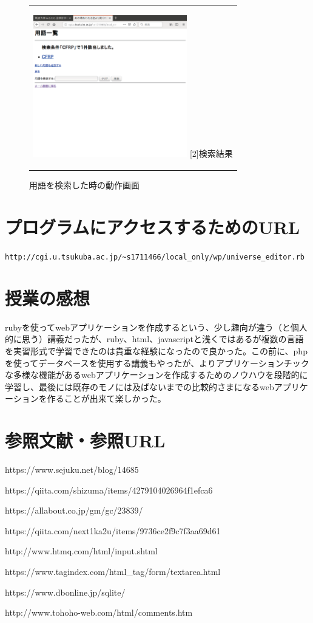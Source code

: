 \documentclass[12pt,a4paper]{jarticle}
\begin{document}
\begin{ttfamily}
\begin{figure}[htbp]
\begin{center}
\begin{tabular}{c}
      \begin{minipage}{0.55\hsize}
        \begin{center}
          \includegraphics[width=6.7cm]{10-3-42.eps}
          \hspace{1.6cm} [2]検索結果
        \end{center}
      \end{minipage}

    \end{tabular}
    \caption{用語を検索した時の動作画面}
    \label{fig:b}
  \end{center}
\end{figure}

\newpage
\newpage
\newpage
\section{プログラムにアクセスするためのURL}
\verb|http://cgi.u.tsukuba.ac.jp/~s1711466/local_only/wp/universe_editor.rb|

\section{授業の感想}
rubyを使ってwebアプリケーションを作成するという、少し趣向が違う（と個人的に思う）講義だったが、ruby、html、javascriptと浅くではあるが複数の言語を実習形式で学習できたのは貴重な経験になったので良かった。この前に、phpを使ってデータベースを使用する講義もやったが、よりアプリケーションチックな多様な機能があるwebアプリケーションを作成するためのノウハウを段階的に学習し、最後には既存のモノには及ばないまでの比較的さまになるwebアプリケーションを作ることが出来て楽しかった。

\section*{参照文献・参照URL}
\par https://www.sejuku.net/blog/14685
\par https://qiita.com/shizuma/items/4279104026964f1efca6
\par https://allabout.co.jp/gm/gc/23839/
\par https://qiita.com/next1ka2u/items/9736ce2f9c7f3aa69d61
\par http://www.htmq.com/html/input.shtml
\par https://www.tagindex.com/html\_tag/form/textarea.html
\par https://www.dbonline.jp/sqlite/
\par http://www.tohoho-web.com/html/comments.htm



\end{ttfamily}
\end{document}
